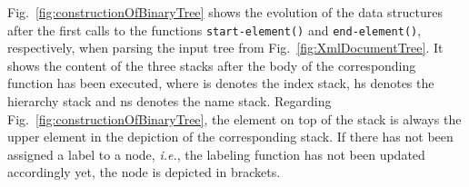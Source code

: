 \documentclass[12pt]{llncs}
\newcommand{\hairsp}{\hspace{1pt}}\newcommand{\TODO}{\textcolor{red}{\bf TODO!}\xspace}
\newcommand{\ie}{\mbox{\textit{i.\hairsp{}e.}}\xspace}
\begin{document}
\begin{example}
Fig.~\ref{fig:constructionOfBinaryTree} shows the evolution of the
data structures after the first calls to the functions \texttt{start-element()}
and \texttt{end-element()}, respectively, when parsing the input tree
from Fig.~\ref{fig:XmlDocumentTree}. It shows the content of the three
stacks after the body of the corresponding function has been executed,
where \textsf{is} denotes the index stack, \textsf{hs} denotes the
hierarchy stack and \textsf{ns} denotes the name stack. Regarding
Fig.~\ref{fig:constructionOfBinaryTree}, the element on top of the
stack is always the upper element in the depiction of the
corresponding stack. If there has not been assigned a label to a node,
\ie, the labeling function  has not been updated accordingly
yet, the node is depicted in brackets.
\end{example}
\end{document}
